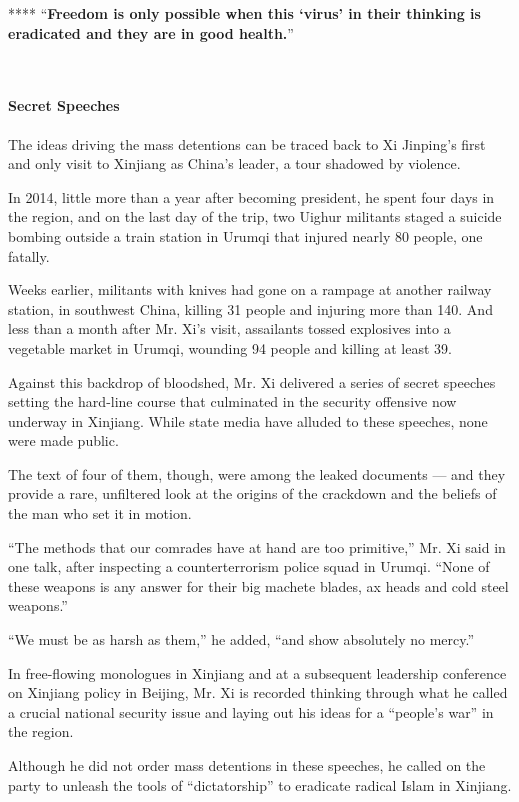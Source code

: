  **** ``\textbf{Freedom is only possible when this `virus' in their
thinking is eradicated and they are in good health.}''

​

\hypertarget{-secret-speeches-}{%
\paragraph{ Secret Speeches }\label{-secret-speeches-}}

The ideas driving the mass detentions can be traced back to Xi Jinping's
first and only visit to Xinjiang as China's leader, a tour shadowed by
violence.

In 2014, little more than a year after becoming president, he spent four
days in the region, and on the last day of the trip, two Uighur
militants staged a suicide bombing outside a train station in Urumqi
that injured nearly 80 people, one fatally.

Weeks earlier, militants with knives had gone on a rampage at another
railway station, in southwest China, killing 31 people and injuring more
than 140. And less than a month after Mr. Xi's visit, assailants tossed
explosives into a vegetable market in Urumqi, wounding 94 people and
killing at least 39.

Against this backdrop of bloodshed, Mr. Xi delivered a series of secret
speeches setting the hard-line course that culminated in the security
offensive now underway in Xinjiang. While state media have alluded to
these speeches, none were made public.

The text of four of them, though, were among the leaked documents ---
and they provide a rare, unfiltered look at the origins of the crackdown
and the beliefs of the man who set it in motion.

``The methods that our comrades have at hand are too primitive,'' Mr. Xi
said in one talk, after inspecting a counterterrorism police squad in
Urumqi. ``None of these weapons is any answer for their big machete
blades, ax heads and cold steel weapons.''

``We must be as harsh as them,'' he added, ``and show absolutely no
mercy.''

In free-flowing monologues in Xinjiang and at a subsequent leadership
conference on Xinjiang policy in Beijing, Mr. Xi is recorded thinking
through what he called a crucial national security issue and laying out
his ideas for a ``people's war'' in the region.

Although he did not order mass detentions in these speeches, he called
on the party to unleash the tools of ``dictatorship'' to eradicate
radical Islam in Xinjiang.

